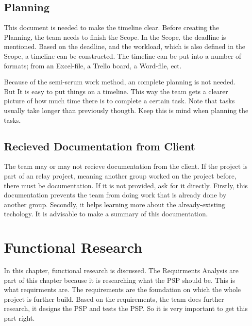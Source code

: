 \documentclass[10pt]{report}
\begin{document}
\newpage

\section{Planning}

This document is needed to make the timeline clear. Before creating the Planning, the team needs to finish the Scope. In the Scope, the deadline is mentioned. Based on the deadline, and the workload, which is also defined in the Scope, a timeline can be constructed. The timeline can be put into a number of formats; from an Excel-file, a Trello board, a Word-file, ect.

Because of the semi-scrum work method, an complete planning is not needed. But It is easy to put things on a timeline. This way the team gets a clearer picture of how much time there is to complete a certain task. Note that tasks usually take longer than previously thougth. Keep this is mind when planning the tasks.

\newpage

\section{Recieved Documentation from Client}

The team may or may not recieve documentation from the client. If the project is part of an relay project, meaning another group worked on the project before, there must be documentation. If it is not provided, ask for it directly. Firstly, this documentation prevents the team from doing work that is already done by another group. Secondly, it helps learning more about the already-existing techology. It is advisable to make a summary of this documentation.

\newpage


\chapter{Functional Research}
\thispagestyle{fancy}

In this chapter, functional research is discussed. The Requirments Analysis are part of this chapter because it is researching what the PSP should be. This is what requirments are. The requirements are the foundation on which the whole project is further build. Based on the requirements, the team does further research, it designs the PSP and tests the PSP. So it is very important to get this part right.
\end{document}
